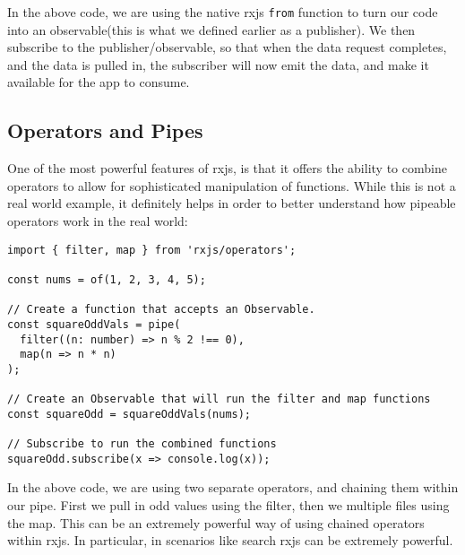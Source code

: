 
In the above code, we are using the native rxjs \lstinline{from} function to
turn our code into an observable(this is what we defined earlier as a 
publisher). We then subscribe to the publisher/observable, so that when the 
data request completes, and the data is pulled in, the subscriber will now 
emit the data, and make it available for the app to consume. 

\subsection{ Operators and Pipes }
One of the most powerful features of rxjs, is that it offers the ability to 
combine operators to allow for sophisticated manipulation of functions. While 
this is not a real world example, it definitely helps in order to better 
understand how pipeable operators work in the real world: 
\begin{lstlisting}
import { filter, map } from 'rxjs/operators';

const nums = of(1, 2, 3, 4, 5);
  
// Create a function that accepts an Observable.
const squareOddVals = pipe(
  filter((n: number) => n % 2 !== 0),
  map(n => n * n)
);  

// Create an Observable that will run the filter and map functions
const squareOdd = squareOddVals(nums);
 
// Subscribe to run the combined functions
squareOdd.subscribe(x => console.log(x));
\end{lstlisting}

In the above code, we are using two separate operators, and chaining them 
within our pipe. First we pull in odd values using the filter, then we 
multiple files using the map. This can be an extremely powerful way of 
using chained operators within rxjs. In particular, in scenarios like search
rxjs can be extremely powerful. 

